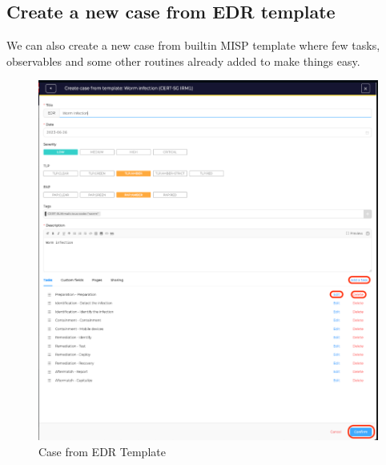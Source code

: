 \documentclass{book}
\begin{document}
\subsection{Create a new case from EDR template}
We can also create a new case from builtin MISP template where few tasks, observables and some
other routines already added to make things easy.
\bigskip
\begin{figure}[h]
    \centering
    \includegraphics[width=.8\linewidth]{Case_images/casefromedr.png}
    \caption{Case from EDR Template}
    \label{fig:casefromedr}
\end{figure}

\newpage
\end{document}
